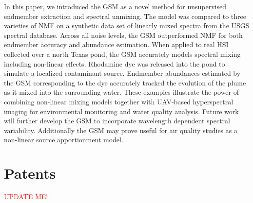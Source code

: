 \documentclass[remotesensing,article,submit,pdftex,moreauthors]{Definitions/mdpi}
\begin{document}
In this paper, we introduced the GSM as a novel method for unsupervised endmember extraction and spectral unmixing. The model was compared to three varieties of NMF on a synthetic data set of linearly mixed spectra from the USGS spectral database. Across all noise levels, the GSM outperformed NMF for both endmember accuracy and abundance estimation. When applied to real HSI collected over a north Texas pond, the GSM accurately models spectral mixing including non-linear effects. Rhodamine dye was released into the pond to simulate a localized contaminant source. Endmember abundances estimated by the GSM corresponding to the dye accurately tracked the evolution of the plume as it mixed into the surrounding water. These examples illustrate the power of combining non-linear mixing models together with UAV-based hyperspectral imaging for environmental monitoring and water quality analysis. Future work will further develop the GSM to incorporate wavelength dependent spectral variability. Additionally the GSM may prove useful for air quality studies as a non-linear source apportionment model.


\section{Patents}

\textcolor{red}{UPDATE ME!}

\vspace{6pt} 




\end{document}

